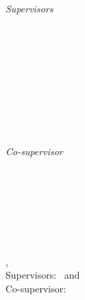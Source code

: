 \begin{titlepage}
	\vfill
	\begin{minipage}[t]{.27\textwidth}
		\raggedleft
		\textit{Supervisors}
	\end{minipage}
	\hspace*{15pt}
	\begin{minipage}[t]{.65\textwidth}
		{\Large \Supervisor} \\
	  	{\small \SupervisorDepartment} \\[-1mm]
		{\small \SupervisorUniversity}
	\end{minipage} \\[5mm]
	\begin{minipage}[t]{.27\textwidth}
		\raggedleft
		\textit{ }
	\end{minipage}
	\hspace*{15pt}
	\begin{minipage}[t]{.65\textwidth}
		{\Large \coSupervisor} \\
	  	{\small \coSupervisorDepartment} \\[-1mm]
		{\small \coSupervisorUniversity}
	\end{minipage} \\[10mm]
	\begin{minipage}[t]{.27\textwidth}
		\raggedleft
		\textit{Co-supervisor}
	\end{minipage}
	\hspace*{15pt}
	\begin{minipage}[t]{.65\textwidth}
		\Assistant\ %
	\end{minipage} \\[10mm]

	\thesisDate \\

\end{titlepage}


\hfill
\vfill
{
	\small
	\textbf{\thesisName} \\
	\textit{\thesisTitle} \\
	\thesisSubject, \thesisDate \\
	Supervisors: \Supervisor\ and \coSupervisor \\
	Co-supervisor: \Assistant\ \\[1.5em]
	\textbf{\thesisUniversity} \\
	\thesisUniversityInstitute \\
	\thesisUniversityDepartment \\
	\thesisUniversityStreetAddress \\
	\thesisUniversityPostalCode\ \thesisUniversityCity
}
